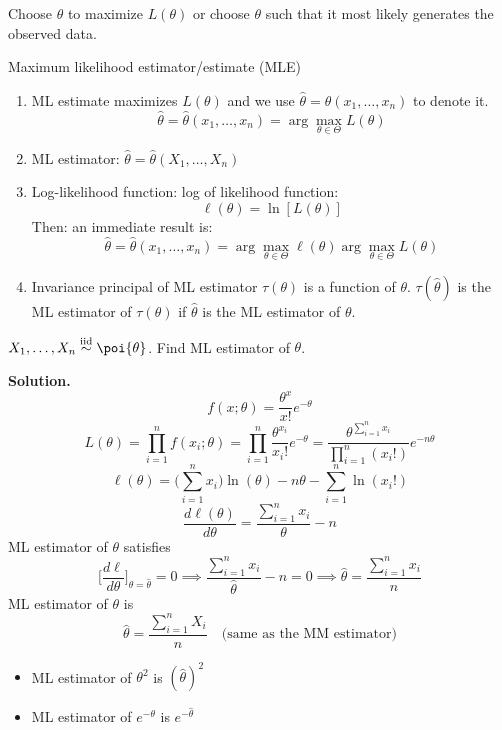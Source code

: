 Choose $ \theta $ to maximize $ L(\theta) $ or choose
$ \theta $ such that it most likely generates the observed data.

Maximum likelihood estimator/estimate (MLE)
\begin{enumerate}
    \item ML estimate maximizes $ L(\theta) $ and we use
          $ \hat{\theta}=\hat{\theta}(x_1,\ldots,x_n) $ to denote it.
          \[ \hat{\theta}=\hat{\theta}(x_1,\ldots,x_n)=
              \arg\max_{\theta\in \Theta}L(\theta) \]
    \item ML estimator: $ \hat{\theta}=\hat{\theta}(X_1,\ldots,X_n) $
    \item Log-likelihood function: log of likelihood function:
          \[ \ell(\theta)=\ln[L(\theta)] \]
          Then: an immediate result is:
          \[ \hat{\theta}=\hat{\theta}(x_1,\ldots,x_n)=
              \arg\max_{\theta\in \Theta}\ell(\theta)
              \arg\max_{\theta\in \Theta}L(\theta) \]
    \item Invariance principal of ML estimator
          $ \tau(\theta) $ is a function of $ \theta $.
          $ \tau(\hat{\theta}) $ is the ML estimator of
          $ \tau(\theta) $ if $ \hat{\theta} $ is the ML
          estimator of $ \theta $.
\end{enumerate}
\begin{Example}{}{}
    $ X_1,\ldots,X_n \stackrel{\text{iid}}{\sim} \poi{\theta} $.
    Find ML estimator of $ \theta $.

    \textbf{Solution.}
    \[ f(x;\theta)=\frac{\theta^x}{x!} e^{-\theta} \]
    \[ L(\theta)=\prod_{i=1}^n f(x_i;\theta)=
        \prod_{i=1}^n \frac{\theta^{x_i}}{x_i!}e^{-\theta}=
        \frac{\theta^{\sum_{i=1}^{n} x_i}}{\prod_{i=1}^n(x_i!)}e^{-n\theta}   \]
    \[ \ell(\theta)=\biggl(\sum_{i=1}^{n} x_i\biggr)\ln(\theta)-n \theta-
        \sum_{i=1}^{n} \ln(x_i!) \]
    \[ \frac{d\ell(\theta)}{d\theta}=\frac{\sum_{i=1}^{n} x_i}{\theta}-n   \]
    ML estimator of $ \theta $ satisfies
    \[ \biggl[\frac{d\ell}{d\theta}\biggr]_{\theta=\hat{\theta}}=0\implies
        \frac{\sum_{i=1}^{n} x_i}{\hat{\theta}}-n=0\implies
        \hat{\theta}=\frac{\sum_{i=1}^{n} x_i}{n}   \]
    ML estimator of $ \theta $ is
    \[ \hat{\theta}=\frac{\sum_{i=1}^{n} X_i}{n}\quad\text{(same as the MM estimator)} \]
\end{Example}
\begin{Remark}{}{}
    \begin{itemize}
        \item ML estimator of $ \theta^2 $ is $ (\hat{\theta})^2 $
        \item ML estimator of $ e^{-\theta} $ is $ e^{-\hat{\theta}} $
    \end{itemize}
\end{Remark}
